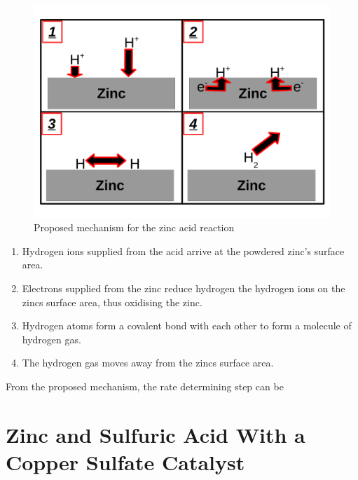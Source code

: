 \begin{figure}[H]
    \includegraphics[width=\textwidth]{./Analysis/Images/UncatalysedMechanism.pdf}
    \caption{Proposed mechanism for the zinc acid reaction} \label{fig:uncatalysedMechanism}
\end{figure}

\begin{enumerate}
\item Hydrogen ions supplied from the acid arrive at the powdered zinc's surface area.
\item Electrons supplied from the zinc reduce hydrogen the hydrogen ions on the zincs surface area, thus oxidising the zinc.
\item Hydrogen atoms form a covalent bond with each other to form a molecule of hydrogen gas.
\item The hydrogen gas moves away from the zincs surface area.
\end{enumerate}

From the proposed mechanism, the rate determining step can be



















\section{Zinc and Sulfuric Acid With a Copper Sulfate Catalyst} 


